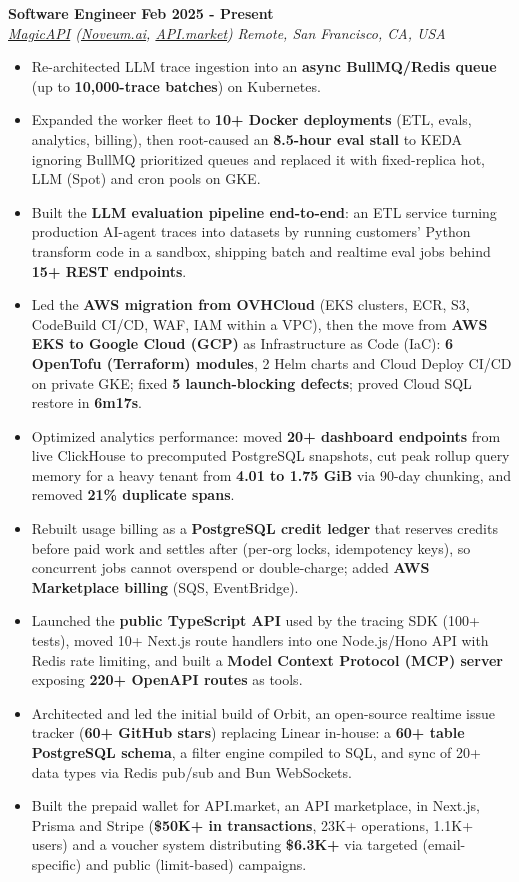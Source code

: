 \documentclass[letterpaper,11pt]{article}
\newcommand{\role}[4]{\item \textbf{#1} \hfill \textbf{#2}\\ \textit{\small #3} \hfill \textit{\small #4}}
\newcommand{\bulletsStart}{\begin{itemize}[leftmargin=0.17in,label={\small\textbullet},itemsep=1pt,parsep=0pt,topsep=1pt,partopsep=0pt]\fontsize{9.5}{10.4}\selectfont}
\newcommand{\bulletsEnd}{\end{itemize}}
\begin{document}
\role{Software Engineer}{Feb 2025 - Present}{\href{https://www.magicapi.com}{MagicAPI} (\href{https://noveum.ai}{Noveum.ai}, \href{https://api.market}{API.market})}{Remote, San Francisco, CA, USA}
\bulletsStart
\item Re-architected LLM trace ingestion into an \textbf{async BullMQ/Redis queue} (up to \textbf{10,000-trace batches}) on Kubernetes.
\item Expanded the worker fleet to \textbf{10+ Docker deployments} (ETL, evals, analytics, billing), then root-caused an \textbf{8.5-hour eval stall} to KEDA ignoring BullMQ prioritized queues and replaced it with fixed-replica hot, LLM (Spot) and cron pools on GKE.
\item Built the \textbf{LLM evaluation pipeline end-to-end}: an ETL service turning production AI-agent traces into datasets by running customers' Python transform code in a sandbox, shipping batch and realtime eval jobs behind \textbf{15+ REST endpoints}.
\item Led the \textbf{AWS migration from OVHCloud} (EKS clusters, ECR, S3, CodeBuild CI/CD, WAF, IAM within a VPC), then the move from \textbf{AWS EKS to Google Cloud (GCP)} as Infrastructure as Code (IaC): \textbf{6 OpenTofu (Terraform) modules}, 2 Helm charts and Cloud Deploy CI/CD on private GKE; fixed \textbf{5 launch-blocking defects}; proved Cloud SQL restore in \textbf{6m17s}.
\item Optimized analytics performance: moved \textbf{20+ dashboard endpoints} from live ClickHouse to precomputed PostgreSQL snapshots, cut peak rollup query memory for a heavy tenant from \textbf{4.01 to 1.75 GiB} via 90-day chunking, and removed \textbf{21\% duplicate spans}.
\item Rebuilt usage billing as a \textbf{PostgreSQL credit ledger} that reserves credits before paid work and settles after (per-org locks, idempotency keys), so concurrent jobs cannot overspend or double-charge; added \textbf{AWS Marketplace billing} (SQS, EventBridge).
\item Launched the \textbf{public TypeScript API} used by the tracing SDK (100+ tests), moved 10+ Next.js route handlers into one Node.js/Hono API with Redis rate limiting, and built a \textbf{Model Context Protocol (MCP) server} exposing \textbf{220+ OpenAPI routes} as tools.
\item Architected and led the initial build of Orbit, an open-source realtime issue tracker (\textbf{60+ GitHub stars}) replacing Linear in-house: a \textbf{60+ table PostgreSQL schema}, a filter engine compiled to SQL, and sync of 20+ data types via Redis pub/sub and Bun WebSockets.
\item Built the prepaid wallet for API.market, an API marketplace, in Next.js, Prisma and Stripe (\textbf{\$50K+ in transactions}, 23K+ operations, 1.1K+ users) and a voucher system distributing \textbf{\$6.3K+} via targeted (email-specific) and public (limit-based) campaigns.
\bulletsEnd
\end{document}
